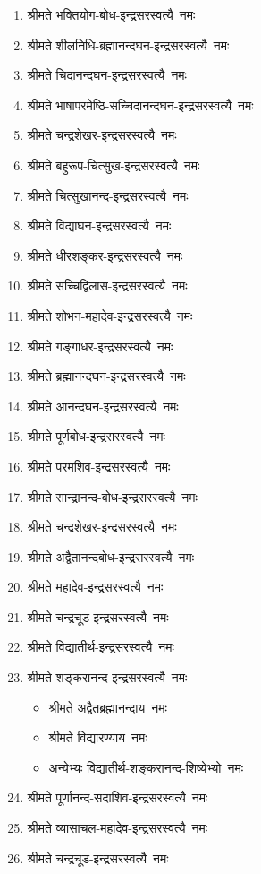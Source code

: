\begin{center}
\begin{flushleft}
\begin{enumerate}
\item श्रीमते भक्तियोग-बोध-इन्द्रसरस्वत्यै~नमः
\item श्रीमते शीलनिधि-ब्रह्मानन्दघन-इन्द्रसरस्वत्यै~नमः
\item श्रीमते चिदानन्दघन-इन्द्रसरस्वत्यै~नमः
\item श्रीमते भाषापरमेष्ठि-सच्चिदानन्दघन-इन्द्रसरस्वत्यै~नमः
\item श्रीमते चन्द्रशेखर-इन्द्रसरस्वत्यै~नमः
\item श्रीमते बहुरूप-चित्सुख-इन्द्रसरस्वत्यै~नमः
\item श्रीमते चित्सुखानन्द-इन्द्रसरस्वत्यै~नमः
\item श्रीमते विद्याघन-इन्द्रसरस्वत्यै~नमः
\item श्रीमते धीरशङ्कर-इन्द्रसरस्वत्यै~नमः
\item श्रीमते सच्चिद्विलास-इन्द्रसरस्वत्यै~नमः
\item श्रीमते शोभन-महादेव-इन्द्रसरस्वत्यै~नमः
\item श्रीमते गङ्गाधर-इन्द्रसरस्वत्यै~नमः
\item श्रीमते ब्रह्मानन्दघन-इन्द्रसरस्वत्यै~नमः
\item श्रीमते आनन्दघन-इन्द्रसरस्वत्यै~नमः
\item श्रीमते पूर्णबोध-इन्द्रसरस्वत्यै~नमः
\item श्रीमते परमशिव-इन्द्रसरस्वत्यै~नमः
\item श्रीमते सान्द्रानन्द-बोध-इन्द्रसरस्वत्यै~नमः
\item श्रीमते चन्द्रशेखर-इन्द्रसरस्वत्यै~नमः
\item श्रीमते अद्वैतानन्दबोध-इन्द्रसरस्वत्यै~नमः
\item श्रीमते महादेव-इन्द्रसरस्वत्यै~नमः
\item श्रीमते चन्द्रचूड-इन्द्रसरस्वत्यै~नमः
\item श्रीमते विद्यातीर्थ-इन्द्रसरस्वत्यै~नमः
\item श्रीमते शङ्करानन्द-इन्द्रसरस्वत्यै~नमः
\begin{itemize}%
\item श्रीमते अद्वैतब्रह्मानन्दाय~नमः
\item श्रीमते विद्यारण्याय~नमः
\item अन्येभ्यः विद्यातीर्थ-शङ्करानन्द-शिष्येभ्यो~नमः
\end{itemize}
\item श्रीमते पूर्णानन्द-सदाशिव-इन्द्रसरस्वत्यै~नमः
\item श्रीमते व्यासाचल-महादेव-इन्द्रसरस्वत्यै~नमः
\item श्रीमते चन्द्रचूड-इन्द्रसरस्वत्यै~नमः

\end{enumerate}
\end{flushleft}
\end{center}

